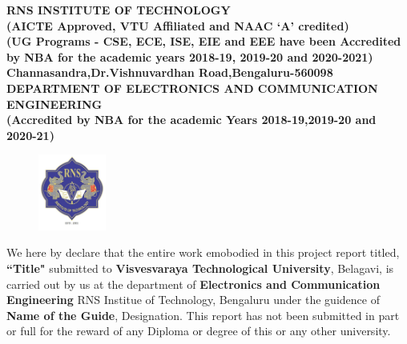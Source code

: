 
\setlength{\toptafiddle}{1in}
\setlength{\bottafiddle}{1in}
\vspace*{-0.5in}
\enlargethispage{\bottafiddle}
\thispagestyle{empty}


\begin{center}
\small\textbf{	RNS INSTITUTE OF TECHNOLOGY\\
(AICTE Approved, VTU Affiliated and NAAC `A' credited)\\
(UG Programs - CSE, ECE, ISE, EIE and EEE have been Accredited by NBA for the academic years 2018-19, 2019-20 and 2020-2021)\\
Channasandra,Dr.Vishnuvardhan Road,Bengaluru-560098}\\
\vspace{0.3cm}
\scriptsize\textbf{DEPARTMENT OF ELECTRONICS AND COMMUNICATION ENGINEERING}\\
\small\textbf{(Accredited by NBA for the academic Years 2018-19,2019-20 and 2020-21)
}
\end{center}

\begin{center}
\begin{figure}[h]
\centering
\includegraphics[height=2.5cm]{images/rns1.jpg}
\end{figure}
\Large{\textbf{\color{red}{DECLARATION}}}
\end{center}

We here by declare that the entire work emobodied in this project report titled, \textbf{\color{red}``Title"} submitted to \textbf{\color{red}Visvesvaraya Technological University}, Belagavi, is carried out by us at the department of \textbf{\color{blue}Electronics and Communication Engineering} RNS Institue of Technology, Bengaluru under the guidence of \textbf{\color{blue}Name of the Guide}, Designation. This report has not been submitted in part or full for the reward of any Diploma or degree of this or any other university.



